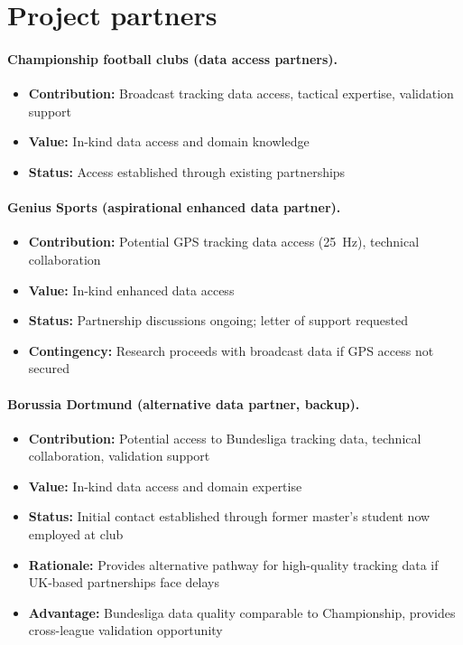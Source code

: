 \section{Project partners}

\paragraph{Championship football clubs (data access partners).}
\begin{itemize}
  \item \textbf{Contribution:} Broadcast tracking data access, tactical expertise, validation support
  \item \textbf{Value:} In-kind data access and domain knowledge
  \item \textbf{Status:} Access established through existing partnerships
\end{itemize}

\paragraph{Genius Sports (aspirational enhanced data partner).}
\begin{itemize}
  \item \textbf{Contribution:} Potential GPS tracking data access (25~Hz), technical collaboration
  \item \textbf{Value:} In-kind enhanced data access
  \item \textbf{Status:} Partnership discussions ongoing; letter of support requested
  \item \textbf{Contingency:} Research proceeds with broadcast data if GPS access not secured
\end{itemize}

\paragraph{Borussia Dortmund (alternative data partner, backup).}
\begin{itemize}
  \item \textbf{Contribution:} Potential access to Bundesliga tracking data, technical collaboration, validation support
  \item \textbf{Value:} In-kind data access and domain expertise
  \item \textbf{Status:} Initial contact established through former master's student now employed at club
  \item \textbf{Rationale:} Provides alternative pathway for high-quality tracking data if UK-based partnerships face delays
  \item \textbf{Advantage:} Bundesliga data quality comparable to Championship, provides cross-league validation opportunity
\end{itemize}
